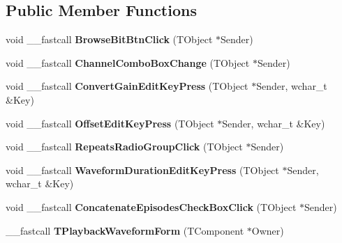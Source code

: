 \subsection*{Public Member Functions}
\begin{DoxyCompactItemize}
\item 
\hypertarget{class_t_playback_waveform_form_a8cc695f219b19d6820bfd6f3f5273647}{void \+\_\+\+\_\+fastcall {\bfseries Browse\+Bit\+Btn\+Click} (T\+Object $\ast$Sender)}\label{class_t_playback_waveform_form_a8cc695f219b19d6820bfd6f3f5273647}

\item 
\hypertarget{class_t_playback_waveform_form_a86a4a88da3dcabc0207dce64f3a14b02}{void \+\_\+\+\_\+fastcall {\bfseries Channel\+Combo\+Box\+Change} (T\+Object $\ast$Sender)}\label{class_t_playback_waveform_form_a86a4a88da3dcabc0207dce64f3a14b02}

\item 
\hypertarget{class_t_playback_waveform_form_a4d6d83cafdeaa4319357e947edab4f7d}{void \+\_\+\+\_\+fastcall {\bfseries Convert\+Gain\+Edit\+Key\+Press} (T\+Object $\ast$Sender, wchar\+\_\+t \&Key)}\label{class_t_playback_waveform_form_a4d6d83cafdeaa4319357e947edab4f7d}

\item 
\hypertarget{class_t_playback_waveform_form_a393109c61194397fe8c4f955637b705c}{void \+\_\+\+\_\+fastcall {\bfseries Offset\+Edit\+Key\+Press} (T\+Object $\ast$Sender, wchar\+\_\+t \&Key)}\label{class_t_playback_waveform_form_a393109c61194397fe8c4f955637b705c}

\item 
\hypertarget{class_t_playback_waveform_form_a4e263a16a577705ae4458167542e3a01}{void \+\_\+\+\_\+fastcall {\bfseries Repeats\+Radio\+Group\+Click} (T\+Object $\ast$Sender)}\label{class_t_playback_waveform_form_a4e263a16a577705ae4458167542e3a01}

\item 
\hypertarget{class_t_playback_waveform_form_acab256b87f2d9dbd899f0bf671930230}{void \+\_\+\+\_\+fastcall {\bfseries Waveform\+Duration\+Edit\+Key\+Press} (T\+Object $\ast$Sender, wchar\+\_\+t \&Key)}\label{class_t_playback_waveform_form_acab256b87f2d9dbd899f0bf671930230}

\item 
\hypertarget{class_t_playback_waveform_form_a83b1e844dc4c1fc5bdbfb5c39be1bda2}{void \+\_\+\+\_\+fastcall {\bfseries Concatenate\+Episodes\+Check\+Box\+Click} (T\+Object $\ast$Sender)}\label{class_t_playback_waveform_form_a83b1e844dc4c1fc5bdbfb5c39be1bda2}

\item 
\hypertarget{class_t_playback_waveform_form_ab52ac2a55e0c2b60139a5468501247bd}{\+\_\+\+\_\+fastcall {\bfseries T\+Playback\+Waveform\+Form} (T\+Component $\ast$Owner)}\label{class_t_playback_waveform_form_ab52ac2a55e0c2b60139a5468501247bd}

\end{DoxyCompactItemize}
